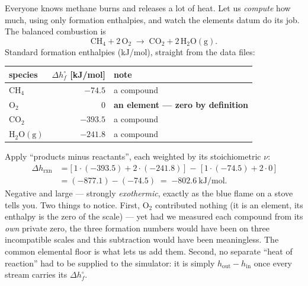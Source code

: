 \documentclass[11pt,a4paper]{article}
\begin{document}
\begin{example}
Everyone knows methane burns and releases a lot of heat.  Let us
\emph{compute} how much, using only formation enthalpies, and watch the
elements datum do its job.  The balanced combustion is
\begin{equation*}
   \mathrm{CH_4} + 2\,\mathrm{O_2} \;\longrightarrow\;
   \mathrm{CO_2} + 2\,\mathrm{H_2O(g)}.
\end{equation*}
Standard formation enthalpies (kJ/mol), straight from the data files:
\begin{center}
\begin{tabular}{lrl}
   \toprule
   species & $\Delta h^{\circ}_{f}$ [kJ/mol] & note \\
   \midrule
   $\mathrm{CH_4}$       & $-74.5$  & a compound \\
   $\mathrm{O_2}$        & $0$      & \textbf{an element --- zero by definition} \\
   $\mathrm{CO_2}$       & $-393.5$ & a compound \\
   $\mathrm{H_2O(g)}$    & $-241.8$ & a compound \\
   \bottomrule
\end{tabular}
\end{center}
Apply ``products minus reactants'', each weighted by its stoichiometric
$\nu$:
\begin{align*}
   \Delta h_{\mathrm{rxn}}
   &= \big[\,1\cdot(-393.5) + 2\cdot(-241.8)\,\big]
      \;-\; \big[\,1\cdot(-74.5) + 2\cdot 0\,\big] \\
   &= (-877.1) - (-74.5) \;=\; \boxed{-802.6~\mathrm{kJ/mol}}.
\end{align*}
Negative and large --- strongly \emph{exothermic}, exactly as the blue
flame on a stove tells you.  Two things to notice.  First, $\mathrm{O_2}$
contributed nothing (it is an element, its enthalpy is the zero of the
scale) --- yet had we measured each compound from its \emph{own} private
zero, the three formation numbers would have been on three incompatible
scales and this subtraction would have been meaningless.  The common
elemental floor is what lets us add them.  Second, no separate ``heat of
reaction'' had to be supplied to the simulator: it is simply
$h_{\mathrm{out}} - h_{\mathrm{in}}$ once every stream carries its
$\Delta h^{\circ}_{f}$.
\end{example}
\end{document}

